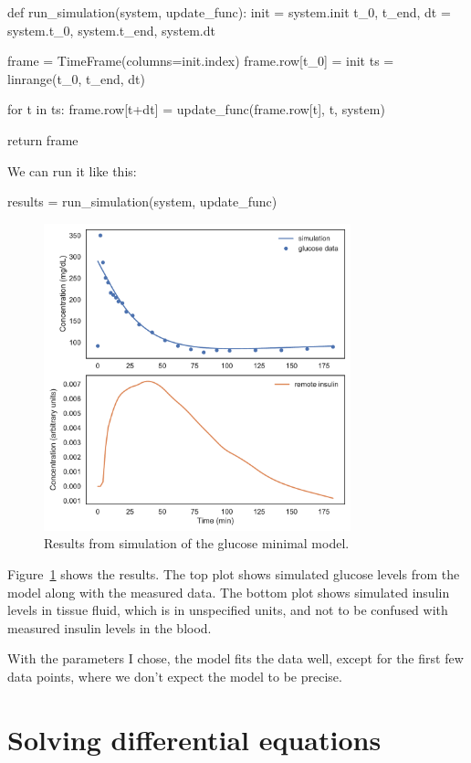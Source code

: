 \documentclass[12pt]{book}
\theoremstyle{exercise}
\begin{document}
\begin{python}
def run_simulation(system, update_func):
    init = system.init
    t_0, t_end, dt = system.t_0, system.t_end, system.dt
    
    frame = TimeFrame(columns=init.index)
    frame.row[t_0] = init
    ts = linrange(t_0, t_end, dt)
    
    for t in ts:
        frame.row[t+dt] = update_func(frame.row[t], t, system)
    
    return frame
\end{python}

We can run it like this:

\begin{python}
results = run_simulation(system, update_func)
\end{python}

\begin{figure}
\centerline{\includegraphics[width=3.5in]{figs/chap18-fig01.pdf}}
\caption{Results from simulation of the glucose minimal model.}
\label{chap18-fig01}
\end{figure}

Figure~\ref{chap18-fig01} shows the results.  The top plot shows simulated glucose levels from the model along with the measured data.  The bottom plot shows simulated insulin levels in tissue fluid, which is in unspecified units, and not to be confused with measured insulin levels in the blood.

With the parameters I chose, the model fits the data well, except for the first few data points, where we don't expect the model to be precise.


\section{Solving differential equations}
\label{slopefunc}
\end{document}

